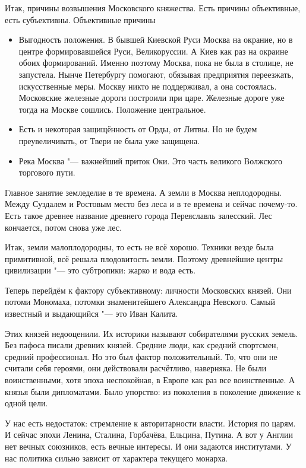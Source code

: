 
Итак, причины возвышения Московского княжества. Есть причины объективные, есть субъективны. Объективные причины
\begin{itemize}
\item Выгодность положения. В бывшей Киевской Руси Москва на окрание, но в центре формировавшейся Руси, Великоруссии. А Киев как раз на окраине обоих формирований. Именно поэтому Москва, пока не была в столице, не запустела. Нынче Петербургу помогают, обязывая предприятия переезжать, искусственные меры. Москву никто не поддерживал, а она состоялась. Московские железные дороги построили при царе. Железные дороге уже тогда на Москве сошлись. Положение центральное.

\item Есть и некоторая защищённость от Орды, от Литвы. Но не будем преувеличивать, от Твери не была уже защищена.
\item Река Москва "--- важнейший приток Оки. Это часть великого Волжского торгового пути.
\end{itemize}

Главное занятие земледелие в те времена. А земли в Москва неплодородны. Между Суздалем и Ростовым место без леса и в те времена и сейчас почему-то. Есть такое древнее название древнего города Переяславль залесский. Лес кончается, потом снова уже лес. 

Итак, земли малоплодородны, то есть не всё хорошо. Техники везде была примитивной, всё решала плодовитость земли. Поэтому древнейшие центры цивилизации "--- это субтропики: жарко и вода есть.

Теперь перейдём к фактору субъективному: личности Московских князей. Они потоми Мономаха, потомки знаменитейшего Александра Невского. Самый известный и выдающийся "--- это Иван Калита.

Этих князей недооценили. Их историки называют собирателями русских земель. Без пафоса писали древних князей. Средние люди, как средний спортсмен, средний профессионал. Но это был фактор положительный. То, что они не считали себя героями, они действовали расчётливо, наверняка. Не были воинственными, хотя эпоха неспокойная, в Европе как раз все воинственные. А князья были дипломатами. Было упорство: из поколения в поколение движение к одной цели.

У нас есть недостаток: стремление к авторитарности власти. История по царям. И сейчас эпохи Ленина, Сталина, Горбачёва, Ельцина, Путина. А вот у Англии нет вечных союзников, есть вечные интересы. И они задаются институтами. У нас политика сильно зависит от характера текущего монарха.

